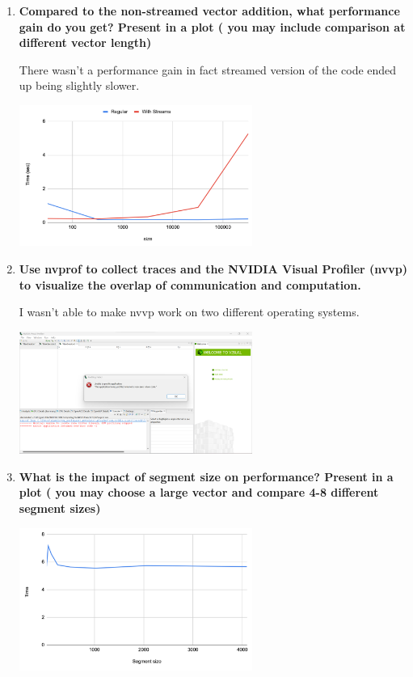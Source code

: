\documentclass[a4paper,11pt]{scrartcl}
\begin{document}
\begin{enumerate}
  \item \textbf{Compared to the non-streamed vector addition, what performance gain do you get? Present in a plot ( you may include comparison at different vector length)}

  There wasn't a performance gain in fact streamed version of the code ended up being slightly slower.
    
  \includegraphics*[width=0.6\textwidth]{images/inputsize.png}

  \item \textbf{Use nvprof to collect traces and the NVIDIA Visual Profiler (nvvp) to visualize the overlap of communication and computation.}

  I wasn't able to make nvvp work on two different operating systems.

  \includegraphics*[width=0.6\textwidth]{images/err.png}

  \item \textbf{What is the impact of segment size on performance? Present in a plot ( you may choose a large vector and compare 4-8 different segment sizes)}

  \includegraphics*[width=0.6\textwidth]{images/segmentsize.png}

\end{enumerate}
\end{document}
